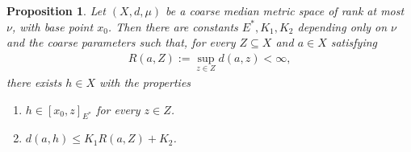 \documentclass[10pt,a4paper]{amsart}
\newtheorem{proposition}{Proposition}
\begin{document}
\begin{proposition}\label{proposition: coarse approximation}
    Let $(X,d,\mu)$ be a coarse median metric space of rank at most $\nu$, with base point $x_0$. Then there are constants $E^*,K_1,K_2$ depending only on $\nu$ and the coarse parameters such that, for every $Z\subseteq X$ and $a\in X$ satisfying
    \begin{align*}
        R(a,Z):=\sup_{z\in Z}d(a,z)<\infty,
    \end{align*}
    there exists $h\in X$ with the properties
    \begin{enumerate}[label=(P\arabic*)]
        \item\label{property: inclusion with E*} $h\in [x_0,z]_{E^*}$ for every $z\in Z$.
        \item\label{property: distance bound with K_1K_2} $d(a,h)\le K_1R(a,Z)+K_2$.
    \end{enumerate}
\end{proposition}
\end{document}
